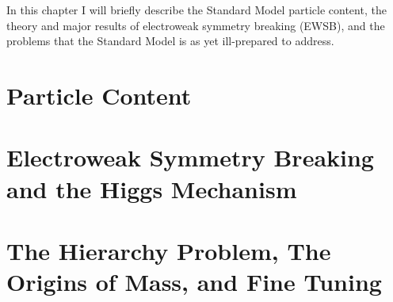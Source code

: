 \documentclass[dissertation.tex]{subfiles}
\begin{document}
In this chapter I will briefly describe the Standard Model particle content, the theory and major results of electroweak symmetry breaking (EWSB), and the problems that the Standard Model is as yet ill-prepared to address.

\section{Particle Content}
\section{Electroweak Symmetry Breaking and the Higgs Mechanism}
\section{The Hierarchy Problem, The Origins of Mass, and Fine Tuning}
\end{document}
